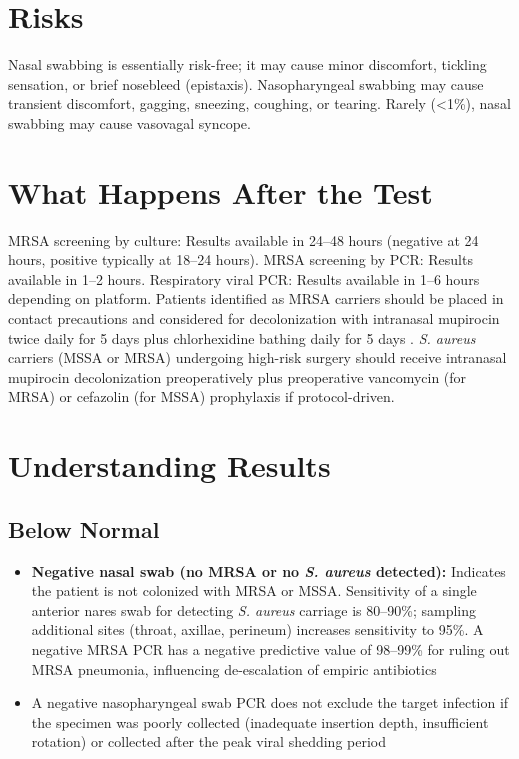 \section*{Risks}
Nasal swabbing is essentially risk-free; it may cause minor discomfort, tickling sensation, or brief nosebleed (epistaxis). Nasopharyngeal swabbing may cause transient discomfort, gagging, sneezing, coughing, or tearing. Rarely (<1\%), nasal swabbing may cause vasovagal syncope.

\section*{What Happens After the Test}
MRSA screening by culture: Results available in 24--48 hours (negative at 24 hours, positive typically at 18--24 hours). MRSA screening by PCR: Results available in 1--2 hours. Respiratory viral PCR: Results available in 1--6 hours depending on platform. Patients identified as MRSA carriers should be placed in contact precautions and considered for decolonization with intranasal mupirocin twice daily for 5 days plus chlorhexidine bathing daily for 5 days \cite{huang2013targeted}. \textit{S. aureus} carriers (MSSA or MRSA) undergoing high-risk surgery should receive intranasal mupirocin decolonization preoperatively plus preoperative vancomycin (for MRSA) or cefazolin (for MSSA) prophylaxis if protocol-driven.

\section*{Understanding Results}

\subsection*{Below Normal}
\begin{itemize}
  \item \textbf{Negative nasal swab (no MRSA or no \textit{S. aureus} detected):} Indicates the patient is not colonized with MRSA or MSSA. Sensitivity of a single anterior nares swab for detecting \textit{S. aureus} carriage is 80--90\%; sampling additional sites (throat, axillae, perineum) increases sensitivity to 95\%. A negative MRSA PCR has a negative predictive value of 98--99\% for ruling out MRSA pneumonia, influencing de-escalation of empiric antibiotics
  \item A negative nasopharyngeal swab PCR does not exclude the target infection if the specimen was poorly collected (inadequate insertion depth, insufficient rotation) or collected after the peak viral shedding period
\end{itemize}

